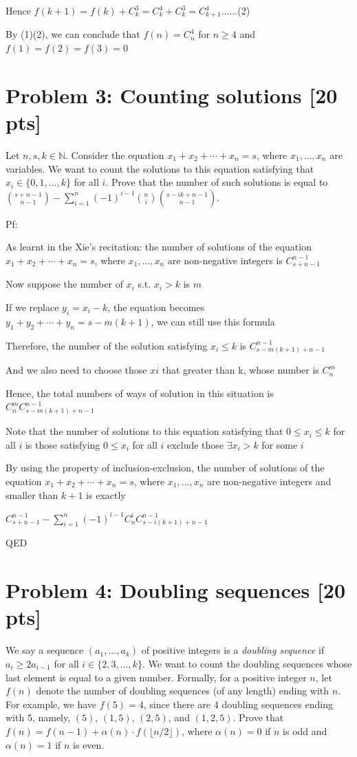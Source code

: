 \documentclass[11pt,twoside]{article}
\newcommand{\problem}[1]{\section*{Problem #1}}
\begin{document}
Hence $f(k+1) = f(k) + C^3_k = C^4_k+C^3_k = C^4_{k+1}$......(2)

By (1)(2), we can conclude that $f(n) = C^4_n$ for $n\geq 4$ and $f(1) =f(2) =f(3) =0$


\problem{3: Counting solutions [20 pts]}
Let $n,s,k \in \mathbb{N}$.
Consider the equation $x_1+x_2+\cdots+x_n = s$, where $x_1,\dots,x_n$ are variables.
We want to count the solutions to this equation satisfying that $x_i \in \{0,1,\dots,k\}$ for all $i$.
Prove that the number of such solutions is equal to $\binom{s+n-1}{n-1} - \sum_{i=1}^n (-1)^{i-1} \binom{n}{i} \binom{s-ik+n-1}{n-1}$.

\hspace*{\fill}

Pf:

As learnt in the Xie's recitation: the number of solutions of the equation $x_1+x_2+\cdots+x_n = s$, where $x_1,\dots,x_n$ are non-negative integers is $C^{n-1}_{s+n-1}$

Now suppose the number of $x_i$ s.t. $x_i > k $ is $m$

If we replace $y_i = x_i - k$, the equation becomes $y_1+y_2+\cdots+y_n = s-m(k+1)$, we can still use this formula

Therefore, the number of the solution satisfying $x_i \leq k$ is $C^{n-1}_{s-m(k+1)+n-1}$

And we also need to choose those $xi$ that greater than k, whose number is $C^m_n$

Hence, the total numbers of ways of solution in this situation is $C^m_nC^{n-1}_{s-m(k+1)+n-1}$

Note that the number of solutions to this equation satisfying that $0\leq x_i \leq k$ for all $i$ is those satisfying $0\leq x_i$ for all $i$ exclude those $\exists x_i > k$ for some $i$

By using the property of inclusion-exclusion, the number of solutions of the equation $x_1+x_2+\cdots+x_n = s$, where $x_1,\dots,x_n$ are non-negative integers and smaller than $k+1$ is exactly

$C^{n-1}_{s+n-1}-\sum ^n_{i=1} (-1)^{i-1 } C^i_nC^{n-1}_{s-i(k+1)+n-1}$

QED


\problem{4: Doubling sequences [20 pts]} 
We say a sequence $(a_1,\dots,a_k)$ of positive integers is a \textit{doubling sequence} if $a_i \geq 2a_{i-1}$ for all $i \in \{2,3,\dots,k\}$.
We want to count the doubling sequences whose last element is equal to a given number.
Formally, for a positive integer $n$, let $f(n)$ denote the number of doubling sequences (of any length) ending with $n$.
For example, we have $f(5) = 4$, since there are $4$ doubling sequences ending with $5$, namely, $(5)$, $(1,5)$, $(2,5)$, and $(1,2,5)$.
Prove that $f(n) = f(n-1) + \alpha(n) \cdot f(\lfloor n/2 \rfloor)$, where $\alpha(n) = 0$ if $n$ is odd and $\alpha(n) = 1$ if $n$ is even.
\end{document}
